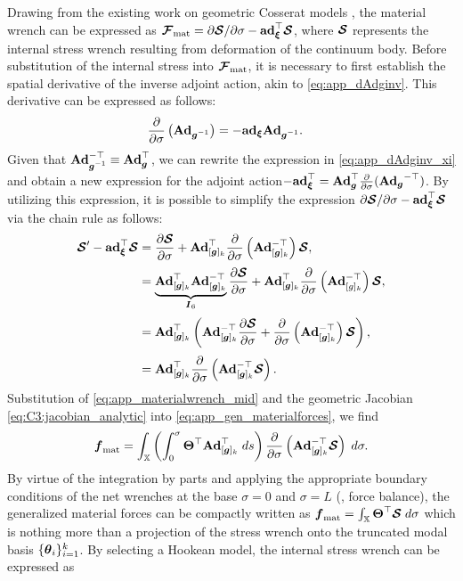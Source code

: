 Drawing from the existing work on geometric Cosserat models \cite{Grazioso2019,Renda2018,Boyer2021}, the material wrench can be expressed as $\boldsymbol{\mathcal{F}}_{\textrm{mat}} = \partial \boldsymbol{\mathcal{S}}/\partial \sigma - \textbf{ad}_{\boldsymbol{\xi}}^\top \boldsymbol{\mathcal{S}}$, where $\boldsymbol{\mathcal{S}}$ represents the internal stress wrench resulting from deformation of the continuum body. Before substitution of the internal stress into ${\boldsymbol{\mathcal{F}}}_{\textrm{mat}}$, it is necessary to first establish the spatial derivative of the inverse adjoint action, akin to \eqref{eq:app_dAdginv}. This derivative can be expressed as follows:
%
\begin{align}
\frac{\p}{\p \sigma}\left(\Ad_{\mat{g}\inv} \right) & = -\ad_{\vec{\xi}}\Ad_{\mat{g}\inv}. \label{eq:app_dAdginv_xi}
\end{align}
%
Given that $\Ad_{\gB\inv}^{-\top} \equiv \Ad_{\gB}^{\top}$, we can rewrite the expression in \eqref{eq:app_dAdginv_xi} and obtain a new expression for the adjoint action$-\textbf{ad}_{\boldsymbol{\xi}}^\top = \textbf{Ad}_{\boldsymbol{g}}^\top \frac{\partial}{\partial \sigma}({\textbf{Ad}_{\boldsymbol{g}}}^{-\top})$. By utilizing this expression, it is possible to simplify the expression $\partial \boldsymbol{\mathcal{S}}/\partial \sigma - \textbf{ad}_{\boldsymbol{\xi}}^\top \boldsymbol{\mathcal{S}}$ via the chain rule as follows:
%
\begin{align}
\boldsymbol{\mathcal{S}}' - \textbf{ad}_{{\boldsymbol{\xi}}}^\top \boldsymbol{\mathcal{S}} & = \frac{\partial \boldsymbol{\mathcal{S}}}{\partial \sigma} + \textbf{Ad}_{[{\boldsymbol{g}}]_k}^\top \frac{\partial}{\partial \sigma} \left(\textbf{Ad}_{[{\boldsymbol{g}}]_k}^{-\top} \right) \boldsymbol{\mathcal{S}}, \notag \\[0.25em]
& = \underbrace{\textbf{Ad}_{[{\boldsymbol{g}}]_k}^{\top} \textbf{Ad}_{[{\boldsymbol{g}}]_k}^{-\top}}_{{\boldsymbol{I}}_6} \frac{\partial \boldsymbol{\mathcal{S}}}{\partial \sigma} + \textbf{Ad}_{[{\boldsymbol{g}}]_k}^\top \frac{\partial}{\partial \sigma} \left(\textbf{Ad}_{[g]_k}^{-\top} \right) \boldsymbol{\mathcal{S}}, \notag \\[0.25em]
& = \textbf{Ad}_{[{\boldsymbol{g}}]_k}^\top \left( \textbf{Ad}_{[{\boldsymbol{g}}]_k}^{-\top} \frac{\partial \boldsymbol{\mathcal{S}}}{\partial \sigma}  + \frac{\partial}{\partial \sigma} \left(\textbf{Ad}_{[{\boldsymbol{g}}]_k}^{-\top} \right) \boldsymbol{\mathcal{S}} \right), \notag \\[0.25em]
& = \textbf{Ad}_{[{\boldsymbol{g}}]_k}^\top \frac{\partial}{\partial \sigma} \left( \textbf{Ad}_{[{\boldsymbol{g}}]_k}^{-\top} \boldsymbol{\mathcal{S}} \right). \label{eq:app_materialwrench_mid}
\end{align}
%
Substitution of \eqref{eq:app_materialwrench_mid} and the geometric Jacobian \eqref{eq:C3:jacobian_analytic} into \eqref{eq:app_gen_materialforces}, we find 
%
\begin{equation}
{\boldsymbol{f}}_{\textrm{mat}} = \int_{\mathbb{X}} \left( \int_0^\sigma {\boldsymbol{\Theta}}^\top \textbf{Ad}_{[{\boldsymbol{g}}]_k}^\top\; ds \right) \frac{\partial}{\partial \sigma} \left( \textbf{Ad}_{[{\boldsymbol{g}}]_k}^{-\top} \boldsymbol{\mathcal{S}} \right) \; d\sigma.
\end{equation}
%
By virtue of the integration by parts and applying the appropriate boundary conditions of the net wrenches at the base $\sigma = 0$ and $\sigma = L$ (\ie, force balance), the generalized material forces can be compactly written as ${\boldsymbol{f}}_{\textrm{mat}} = \int_{\mathbb{X}} {\boldsymbol{\Theta}}^\top \boldsymbol{\mathcal{S}} \; d\sigma$ which is nothing more than a projection of the stress wrench onto the truncated modal basis $\{{\boldsymbol{\theta}}_i\}_{i=1}^k$. By selecting a Hookean model, the internal stress wrench can be expressed as 
